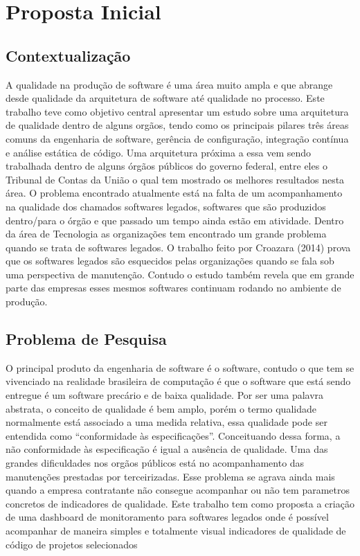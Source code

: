 
\chapter[Proposta Inicial]{Proposta Inicial}

\section{Contextualização}
	A qualidade na produção de software é uma área muito ampla e que abrange desde qualidade da arquitetura de software até qualidade no processo. Este trabalho teve como objetivo central apresentar um estudo sobre uma arquitetura de qualidade dentro de alguns orgãos, tendo como os principais pilares três áreas comuns da engenharia de software, gerência de configuração, integração contínua e análise estática de código. Uma arquitetura próxima a essa vem sendo trabalhada dentro de alguns órgãos públicos do governo federal, entre eles o Tribunal de Contas da União o qual tem mostrado os melhores resultados nesta área. O problema encontrado atualmente está na falta de um acompanhamento na qualidade dos chamados softwares legados, softwares que são produzidos dentro/para o órgão e que passado um tempo ainda estão em atividade.
	Dentro da área de Tecnologia as organizações tem encontrado um grande problema quando se trata de softwares legados. O trabalho feito por Croazara (2014) prova que os softwares legados são esquecidos pelas organizações quando se fala sob uma perspectiva de manutenção. Contudo o estudo também revela que em grande parte das empresas esses mesmos softwares continuam rodando no ambiente de produção.
	
	
\section{Problema de Pesquisa}
	O principal produto da engenharia de software é o software, contudo o que tem se vivenciado na realidade brasileira de computação é que o software que está sendo entregue é um software precário e de baixa qualidade. Por ser uma palavra abstrata, o conceito de qualidade é bem amplo, porém o termo qualidade normalmente está associado a uma medida relativa, essa qualidade pode ser entendida como “conformidade às especificações”. Conceituando dessa forma, a não conformidade às especificação é igual a ausência de qualidade.
	Uma das grandes dificuldades nos orgãos públicos está no acompanhamento das manutenções prestadas por terceirizadas. Esse problema se agrava ainda mais quando a empresa contratante não consegue acompanhar ou não tem parametros concretos de indicadores de qualidade. Este trabalho tem como proposta a criação de uma dashboard de monitoramento para softwares legados onde é possível acompanhar de maneira simples e totalmente visual indicadores de qualidade de código de projetos selecionados
	

